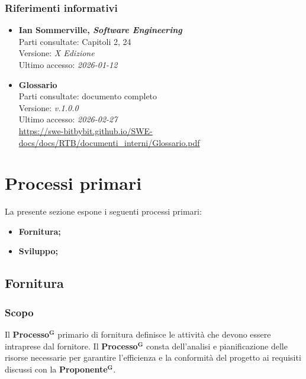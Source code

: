 \documentclass[a4paper,12pt]{article}
\newcommand{\term}[1]{\textbf{#1}$^\mathbf{G}$}
\begin{document}
\subsubsection{Riferimenti informativi}
\begin{itemize}\raggedright
    \item \textbf{Ian Sommerville, \emph{Software Engineering}}\\
    Parti consultate: Capitoli 2, 24\\
    Versione: \textit{X Edizione}\\
    Ultimo accesso: \textit{2026-01-12}\\
    \item \textbf{Glossario}\\
        Parti consultate: documento completo\\
        Versione: \textit{v.1.0.0}\\
        Ultimo accesso: \textit{2026-02-27}\\
        \url{https://swe-bitbybit.github.io/SWE-docs/docs/RTB/documenti_interni/Glossario.pdf}
\end{itemize}

\section{Processi primari}
La presente sezione espone i seguenti processi primari:
\begin{itemize}
    \item[(a)] \textbf{Fornitura;}
    \item[(b)] \textbf{Sviluppo;}
\end{itemize}

\subsection{Fornitura} \label{sec:processo-fornitura}
\subsubsection{Scopo}
Il \term{Processo} primario di fornitura definisce le attività che devono essere intraprese dal fornitore. Il \term{Processo} consta dell’analisi e pianificazione delle risorse necessarie per garantire l’efficienza e la conformità del progetto ai requisiti discussi con la \term{Proponente}.
\end{document}
